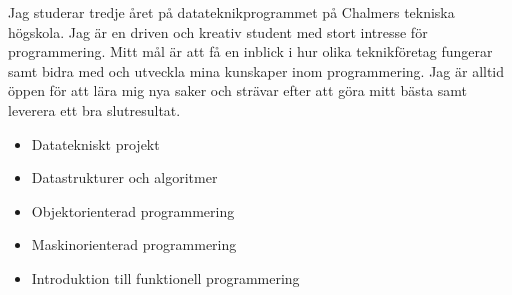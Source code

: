 







Jag studerar tredje året på datateknikprogrammet på Chalmers tekniska högskola. Jag är en driven och kreativ student med stort intresse för programmering. Mitt mål är att få en inblick i hur olika teknikföretag fungerar samt bidra med och utveckla mina kunskaper inom programmering. Jag är alltid öppen för att lära mig nya saker och strävar efter att göra mitt bästa samt leverera ett bra slutresultat.





\begin{itemize}
    \item Datatekniskt projekt
    \item Datastrukturer och algoritmer
    \item Objektorienterad programmering
    \item Maskinorienterad programmering
    \item Introduktion till funktionell programmering
\end{itemize}

